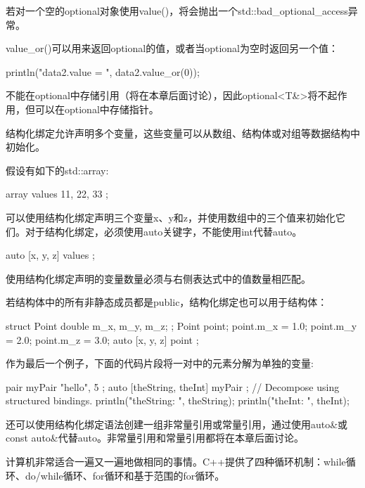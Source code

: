 若对一个空的optional对象使用value()，将会抛出一个std::bad\_optional\_access异常。

value\_or()可以用来返回optional的值，或者当optional为空时返回另一个值：

\begin{cpp}
println("data2.value = {}", data2.value_or(0));
\end{cpp}

不能在optional中存储引用（将在本章后面讨论），因此optional<T\&>将不起作用，但可以在optional中存储指针。


结构化绑定允许声明多个变量，这些变量可以从数组、结构体或对组等数据结构中初始化。

假设有如下的std::array:

\begin{cpp}
array values { 11, 22, 33 };
\end{cpp}

可以使用结构化绑定声明三个变量x、y和z，并使用数组中的三个值来初始化它们。对于结构化绑定，必须使用auto关键字，不能使用int代替auto。

\begin{cpp}
auto [x, y, z] { values };
\end{cpp}

使用结构化绑定声明的变量数量必须与右侧表达式中的值数量相匹配。

若结构体中的所有非静态成员都是public，结构化绑定也可以用于结构体：

\begin{cpp}
struct Point { double m_x, m_y, m_z; };
Point point;
point.m_x = 1.0; point.m_y = 2.0; point.m_z = 3.0;
auto [x, y, z] { point };
\end{cpp}

作为最后一个例子，下面的代码片段将一对中的元素分解为单独的变量:

\begin{cpp}
pair myPair { "hello", 5 };
auto [theString, theInt] { myPair }; // Decompose using structured bindings.
println("theString: {}", theString);
println("theInt: {}", theInt);
\end{cpp}

还可以使用结构化绑定语法创建一组非常量引用或常量引用，通过使用auto\&或 const auto\&代替auto。非常量引用和常量引用都将在本章后面讨论。


计算机非常适合一遍又一遍地做相同的事情。C++提供了四种循环机制：while循环、do/while循环、for循环和基于范围的for循环。


